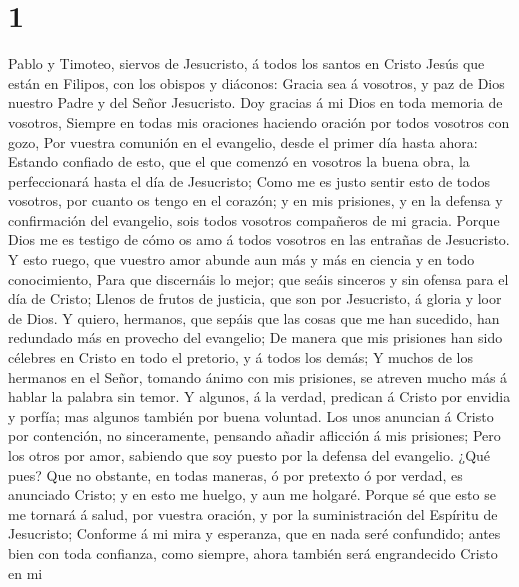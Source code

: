 \hypertarget{section}{%
\section{1}\label{section}}

 Pablo y Timoteo, siervos de Jesucristo, á todos los
santos en Cristo Jesús que están en Filipos, con los obispos y diáconos:
 Gracia sea á vosotros, y paz de Dios nuestro Padre y del
Señor Jesucristo.  Doy gracias á mi Dios en toda memoria
de vosotros,  Siempre en todas mis oraciones haciendo
oración por todos vosotros con gozo,  Por vuestra comunión
en el evangelio, desde el primer día hasta ahora:  Estando
confiado de esto, que el que comenzó en vosotros la buena obra, la
perfeccionará hasta el día de Jesucristo;  Como me es
justo sentir esto de todos vosotros, por cuanto os tengo en el corazón;
y en mis prisiones, y en la defensa y confirmación del evangelio, sois
todos vosotros compañeros de mi gracia.  Porque Dios me es
testigo de cómo os amo á todos vosotros en las entrañas de Jesucristo.
 Y esto ruego, que vuestro amor abunde aun más y más en
ciencia y en todo conocimiento,  Para que discernáis lo
mejor; que seáis sinceros y sin ofensa para el día de Cristo;
 Llenos de frutos de justicia, que son por Jesucristo, á
gloria y loor de Dios.  Y quiero, hermanos, que sepáis
que las cosas que me han sucedido, han redundado más en provecho del
evangelio;  De manera que mis prisiones han sido célebres
en Cristo en todo el pretorio, y á todos los demás;  Y
muchos de los hermanos en el Señor, tomando ánimo con mis prisiones, se
atreven mucho más á hablar la palabra sin temor.  Y
algunos, á la verdad, predican á Cristo por envidia y porfía; mas
algunos también por buena voluntad.  Los unos anuncian á
Cristo por contención, no sinceramente, pensando añadir aflicción á mis
prisiones;  Pero los otros por amor, sabiendo que soy
puesto por la defensa del evangelio.  ¿Qué pues? Que no
obstante, en todas maneras, ó por pretexto ó por verdad, es anunciado
Cristo; y en esto me huelgo, y aun me holgaré.  Porque sé
que esto se me tornará á salud, por vuestra oración, y por la
suministración del Espíritu de Jesucristo;  Conforme á mi
mira y esperanza, que en nada seré confundido; antes bien con toda
confianza, como siempre, ahora también será engrandecido Cristo en mi

